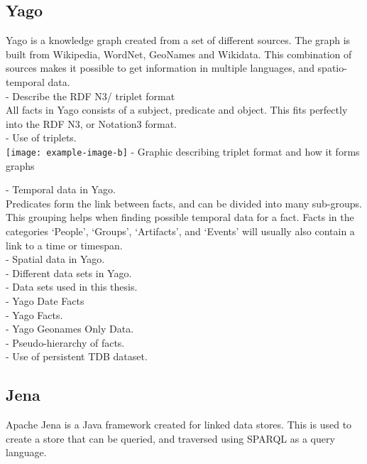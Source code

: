 \subsection{Yago}
Yago\cite{yago} is a knowledge graph created from a set of different sources. The graph is built from Wikipedia, WordNet, GeoNames and Wikidata. This combination of sources makes it possible to get information in multiple languages, and spatio-temporal data. \\

- Describe the RDF N3/ triplet format\\
All facts in Yago consists of a subject, predicate and object. This fits perfectly into the RDF N3, or Notation3 format.\\

- Use of triplets.\\

\texttt{[image: example-image-b]}
- Graphic describing triplet format and how it forms graphs


- Temporal data in Yago.\\
Predicates form the link between facts, and can be divided into many sub-groups. This grouping helps when finding possible temporal data for a fact. Facts in the categories `People', `Groups', `Artifacts', and `Events' will usually also contain a link to a time or timespan.\\

- Spatial data in Yago.\\


- Different data sets in Yago.\\
- Data sets used in this thesis.\\
	- Yago Date Facts\\
	- Yago Facts.\\
	- Yago Geonames Only Data.\\
- Pseudo-hierarchy of facts.\\
- Use of persistent TDB dataset.\\

\subsection{Jena}
Apache Jena is a Java framework created for linked data stores. This is used to create a store that can be queried, and traversed using SPARQL as a query language.  \\

\clearpage